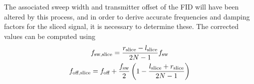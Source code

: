 The associated sweep width and transmitter offset of the \ac{FID} will have
been altered by this process, and in order to derive accurate frequencies and
damping factors for the sliced signal, it is necessary to determine these. The
corrected values can be computed using
\begin{subequations}
    \begin{gather}
        f_{\text{sw,slice}} = \frac{r_{\text{slice}} - l_{\text{slice}}}{2N - 1} f_{\mathrm{sw}}\\
        f_{\text{off,slice}} = f_{\text{off}} + \frac{f_{\mathrm{sw}}}{2} \left(
            1 - \frac{l_{\text{slice}} + r_{\text{slice}}}{2N - 1}
        \right)
    \end{gather}
\end{subequations}
